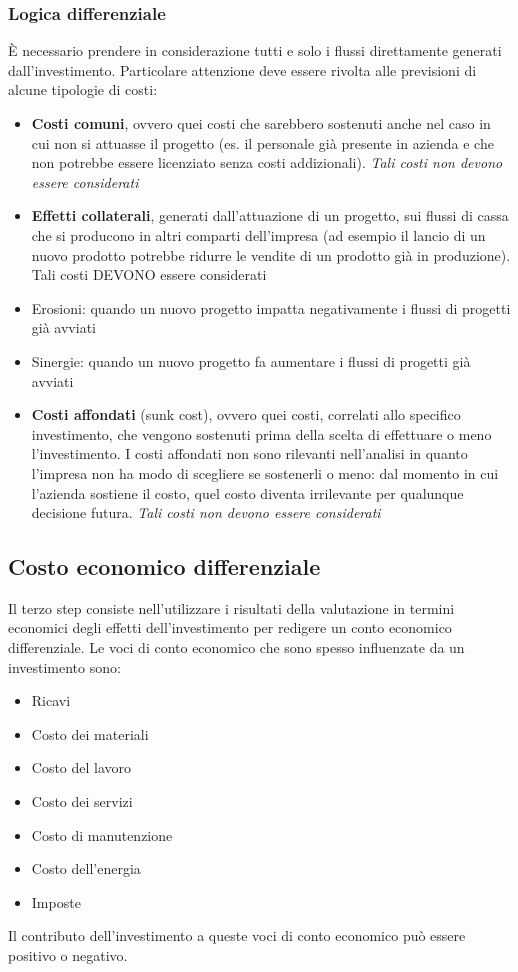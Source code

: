 \subsubsection{Logica differenziale}
È necessario prendere in considerazione tutti e solo i flussi direttamente generati
dall’investimento.
Particolare attenzione deve essere rivolta alle previsioni di alcune tipologie di costi:
\begin{itemize}
    \item \textbf{Costi comuni}, ovvero quei costi che sarebbero sostenuti anche nel caso in cui non si attuasse il progetto (es. il
    personale già presente in azienda e che non potrebbe essere licenziato senza costi addizionali). \emph{Tali costi non
    devono essere considerati}
    \item \textbf{Effetti collaterali}, generati dall’attuazione di un progetto, sui flussi di cassa che si producono in altri comparti
    dell’impresa (ad esempio il lancio di un nuovo prodotto potrebbe ridurre le vendite di un prodotto già in produzione).
    Tali costi DEVONO essere considerati
    \item Erosioni: quando un nuovo progetto impatta negativamente i flussi di progetti già avviati
    \item Sinergie: quando un nuovo progetto fa aumentare i flussi di progetti già avviati 
    \item \textbf{Costi affondati} (sunk cost), ovvero quei costi, correlati allo specifico investimento, che vengono sostenuti prima
    della scelta di effettuare o meno l’investimento.
    I costi affondati non sono rilevanti nell’analisi in quanto l’impresa non ha modo di scegliere se sostenerli o meno: dal
    momento in cui l’azienda sostiene il costo, quel costo diventa irrilevante per qualunque decisione futura.
    \emph{Tali costi non devono essere considerati}
\end{itemize}


\subsection{Costo economico differenziale}
Il terzo step consiste nell’utilizzare i risultati della valutazione in termini economici degli effetti
dell’investimento per redigere un conto economico differenziale.
Le voci di conto economico che sono spesso influenzate da un investimento sono:
\begin{itemize}
    \item Ricavi
    \item Costo dei materiali
    \item Costo del lavoro
    \item Costo dei servizi
    \item Costo di manutenzione
    \item Costo dell’energia
    \item Imposte
\end{itemize}
Il contributo dell’investimento a queste voci di conto economico può essere positivo o negativo.

